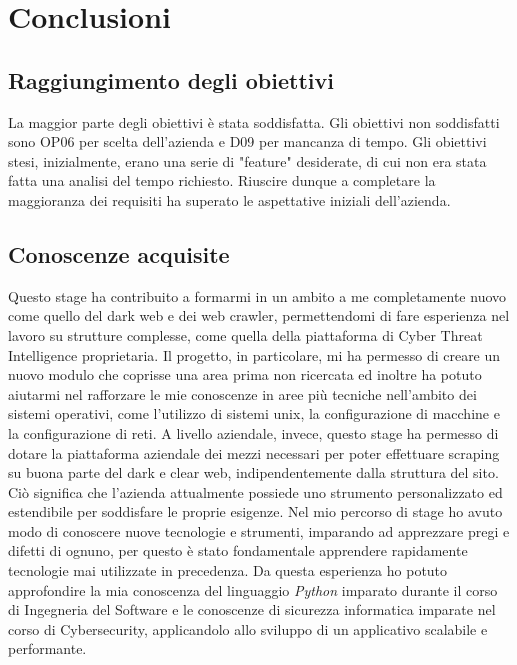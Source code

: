 

\chapter{Conclusioni}
\label{cap:conclusioni}

\section{Raggiungimento degli obiettivi}
La maggior parte degli obiettivi è stata soddisfatta. Gli obiettivi non soddisfatti sono OP06 per scelta dell'azienda e D09 per mancanza di tempo. Gli obiettivi stesi, inizialmente, erano una serie di "feature" desiderate, di cui non era stata fatta una analisi del tempo richiesto. Riuscire dunque a completare la maggioranza dei requisiti ha superato le aspettative iniziali dell'azienda.

\section{Conoscenze acquisite}
Questo stage ha contribuito a formarmi in un ambito a me completamente nuovo come quello del dark web e dei web crawler, permettendomi di fare esperienza nel lavoro su strutture complesse, come quella della piattaforma di Cyber Threat Intelligence proprietaria. Il progetto, in particolare, mi ha permesso di creare un nuovo modulo che coprisse una area prima non ricercata ed inoltre ha potuto aiutarmi nel rafforzare le mie conoscenze in aree più tecniche nell'ambito dei sistemi operativi, come l'utilizzo di sistemi unix, la configurazione di macchine e la configurazione di reti. A livello aziendale, invece, questo stage ha permesso di dotare la piattaforma aziendale dei mezzi necessari per poter effettuare scraping su buona parte del dark e clear web, indipendentemente dalla struttura del sito. Ciò significa che l’azienda attualmente possiede uno strumento personalizzato ed estendibile per soddisfare le proprie esigenze. \newline{}
Nel mio percorso di stage ho avuto modo di conoscere nuove tecnologie e strumenti, imparando ad apprezzare pregi e difetti di ognuno, per questo è stato fondamentale apprendere rapidamente tecnologie mai utilizzate in precedenza.
Da questa esperienza ho potuto approfondire la mia conoscenza del linguaggio \textit{Python} imparato durante il corso di Ingegneria del Software e le conoscenze di sicurezza informatica imparate nel corso di Cybersecurity, applicandolo allo sviluppo di un applicativo scalabile e performante.
\newpage
